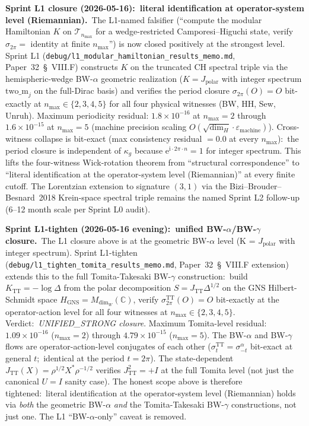 \documentclass[11pt]{article}
\begin{document}
\textbf{Sprint L1 closure (2026-05-16):\ literal identification at
operator-system level (Riemannian).}\ The L1-named falsifier
(``compute the modular Hamiltonian $K$ on $\mathcal{T}_{n_{\max}}$
for a wedge-restricted Camporesi--Higuchi state, verify
$\sigma_{2\pi} = $ identity at finite $n_{\max}$'') is now closed
positively at the strongest level.  Sprint L1
(\texttt{debug/l1\_modular\_hamiltonian\_results\_memo.md},
Paper~32~\S~VIII.F) constructs $K$ on the truncated CH spectral triple
via the hemispheric-wedge BW-$\alpha$ geometric realization
($K = J_{\mathrm{polar}}$ with integer spectrum $\mathrm{two\_m}_j$
on the full-Dirac basis) and verifies the period closure
$\sigma_{2\pi}(O) = O$ bit-exactly at $n_{\max} \in \{2, 3, 4, 5\}$
for all four physical witnesses (BW, HH, Sew, Unruh).  Maximum
periodicity residual: $1.8 \times 10^{-16}$ at $n_{\max}=2$ through
$1.6 \times 10^{-15}$ at $n_{\max}=5$ (machine precision scaling
$O(\sqrt{\dim_H} \cdot \varepsilon_{\mathrm{machine}})$).
Cross-witness collapse is bit-exact (max consistency residual
$= 0.0$ at every $n_{\max}$):\ the period closure is independent
of $\kappa_g$ because $\mathrm{e}^{\mathrm{i}\cdot 2\pi \cdot n} = 1$
for integer spectrum.  This lifts the four-witness Wick-rotation
theorem from ``structural correspondence'' to ``literal identification
at the operator-system level (Riemannian)'' at every finite cutoff.
The Lorentzian extension to signature $(3, 1)$ via the
Bizi--Brouder--Besnard~2018 Krein-space spectral triple remains the
named Sprint L2 follow-up (6--12 month scale per Sprint L0 audit).

\textbf{Sprint L1-tighten (2026-05-16 evening):\ unified BW-$\alpha$/BW-$\gamma$
closure.}\ The L1 closure above is at the geometric BW-$\alpha$ level
(K = $J_{\mathrm{polar}}$ with integer spectrum). Sprint L1-tighten
(\texttt{debug/l1\_tighten\_tomita\_results\_memo.md}, Paper~32~\S~VIII.F
extension) extends this to the full Tomita-Takesaki BW-$\gamma$
construction:\ build $K_{\mathrm{TT}} = -\log \Delta$ from the polar
decomposition $S = J_{\mathrm{TT}} \Delta^{1/2}$ on the GNS
Hilbert-Schmidt space $H_{\mathrm{GNS}} = M_{\dim_W}(\mathbb{C})$,
verify $\sigma_{2\pi}^{\mathrm{TT}}(O) = O$ bit-exactly at the
operator-action level for all four witnesses at $n_{\max} \in \{2, 3,
4, 5\}$. Verdict:\ \emph{UNIFIED\_STRONG closure}. Maximum Tomita-level
residual: $1.09\times 10^{-16}$ ($n_{\max}=2$) through $4.79\times
10^{-15}$ ($n_{\max}=5$).  The BW-$\alpha$ and BW-$\gamma$ flows are
operator-action-level conjugates of each other ($\sigma_t^{\mathrm{TT}}
= \sigma_{-t}^{\alpha}$ bit-exact at general $t$;\ identical at the
period $t = 2\pi$).  The state-dependent $J_{\mathrm{TT}}(X) =
\rho^{1/2} X^* \rho^{-1/2}$ verifies $J_{\mathrm{TT}}^2 = +I$ at the
full Tomita level (not just the canonical $U = I$ sanity case).  The
honest scope above is therefore tightened:\ literal identification at
the operator-system level (Riemannian) holds via \emph{both} the
geometric BW-$\alpha$ \emph{and} the Tomita-Takesaki BW-$\gamma$
constructions, not just one.  The L1 ``BW-$\alpha$-only'' caveat is
removed.
\end{document}
